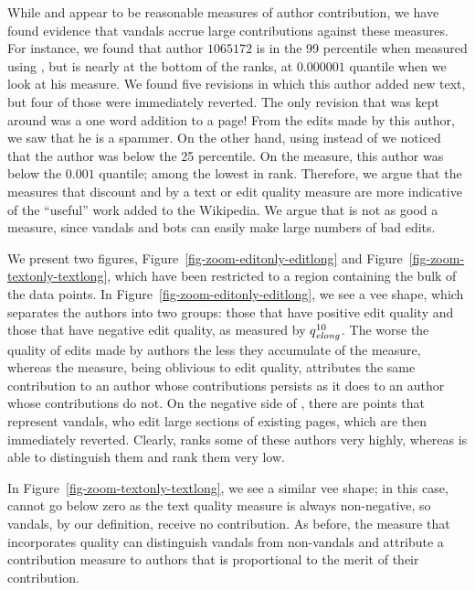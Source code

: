 While \textonly and \editonly appear to be reasonable measures
of author contribution, we have found evidence that vandals
accrue large contributions against these measures.
For instance, we found that author $1065172$ is in the 99
percentile when measured using \textonly, but is nearly at the
bottom of the ranks, at $0.000001$ quantile when we look at his
\punish measure.
We found five revisions in which this author added new text, but
four of those were immediately reverted.
The only revision that was kept around was a one word addition to a
page!
From the edits made by this author, we saw that he is a spammer.
On the other hand, using \textlong instead of \textonly we
noticed that the author was below the 25 percentile.
On the \editlong measure, this author was below the
$0.001$ quantile; among the lowest in rank.
Therefore, we argue that the measures that discount \textonly and
\editonly by a text or edit quality measure are more indicative
of the ``useful'' work added to the Wikipedia.
We argue that \numedits is not as good a measure, since
vandals and bots can easily make large numbers of bad edits.

We present two figures, Figure~\ref{fig-zoom-editonly-editlong}
and Figure~\ref{fig-zoom-textonly-textlong},
which have been restricted to a region containing the
bulk of the data points.
In Figure~\ref{fig-zoom-editonly-editlong},
we see a vee shape, which separates the authors into
two groups: those that have positive edit quality and those
that have negative edit quality, as measured by $\quality{elong}{10}{}$.
The worse the quality of edits made by authors the less they
accumulate of the \editlong measure, whereas the \editonly
measure, being oblivious to edit quality, attributes the same
contribution to an author whose contributions persists as it
does to an author whose contributions do not.
On the negative side of \editlong, there are points that represent
vandals, who edit large sections of existing pages, which are
then immediately reverted.
Clearly, \editonly ranks some of these authors very highly,
whereas \editlong is able to distinguish them and rank
them very low.

In Figure~\ref{fig-zoom-textonly-textlong},
we see a similar vee shape; in this case, \textlong
cannot go below zero as the text quality measure is always
non-negative, so vandals, by our definition, receive no
contribution.
As before, the measure that incorporates quality can
distinguish vandals from non-vandals and attribute a contribution
measure to authors that is proportional to the merit of their
contribution.

